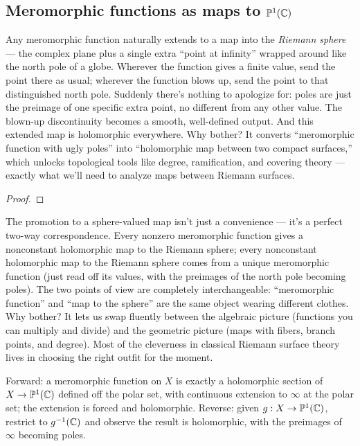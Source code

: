 \subsection{Meromorphic functions as maps to \texorpdfstring{\(\mathbb{P}^{1}(\mathbb{C})\)}{CP1}}



\begin{layman}
Any meromorphic function naturally extends to a map into the \emph{Riemann
sphere} --- the complex plane plus a single extra ``point at infinity''
wrapped around like the north pole of a globe. Wherever the function gives
a finite value, send the point there as usual; wherever the function blows
up, send the point to that distinguished north pole. Suddenly there's
nothing to apologize for: poles are just the preimage of one specific
extra point, no different from any other value. The blown-up
discontinuity becomes a smooth, well-defined output. And this extended
map is holomorphic everywhere. Why bother? It converts ``meromorphic
function with ugly poles'' into ``holomorphic map between two compact
surfaces,'' which unlocks topological tools like degree, ramification,
and covering theory --- exactly what we'll need to analyze maps between
Riemann surfaces.
\end{layman}


\begin{proof}\leanok\end{proof}

\begin{layman}
The promotion to a sphere-valued map isn't just a convenience --- it's a
perfect two-way correspondence. Every nonzero meromorphic function gives a
nonconstant holomorphic map to the Riemann sphere; every nonconstant
holomorphic map to the Riemann sphere comes from a unique meromorphic
function (just read off its values, with the preimages of the north pole
becoming poles). The two points of view are completely interchangeable:
``meromorphic function'' and ``map to the sphere'' are the same object
wearing different clothes. Why bother? It lets us swap fluently between
the algebraic picture (functions you can multiply and divide) and the
geometric picture (maps with fibers, branch points, and degree). Most of
the cleverness in classical Riemann surface theory lives in choosing the
right outfit for the moment.
\end{layman}

\begin{proofsketch}
Forward: a meromorphic function on \(X\) is exactly a holomorphic
section of \(X\to\mathbb{P}^{1}(\mathbb{C})\) defined off the polar set, with continuous
extension to \(\infty\) at the polar set; the extension is forced and
holomorphic. Reverse: given \(g:X\to\mathbb{P}^{1}(\mathbb{C})\), restrict to
\(g^{-1}(\mathbb{C})\) and observe the result is holomorphic, with the
preimages of \(\infty\) becoming poles.
\end{proofsketch}

